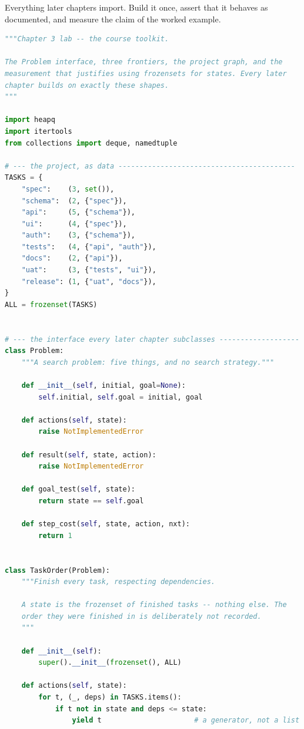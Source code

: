 \begin{lab}
Everything later chapters import. Build it once, assert that it behaves as
documented, and measure the claim of the worked example.
\begin{lstlisting}[language=Python]
"""Chapter 3 lab -- the course toolkit.

The Problem interface, three frontiers, the project graph, and the
measurement that justifies using frozensets for states. Every later
chapter builds on exactly these shapes.
"""

import heapq
import itertools
from collections import deque, namedtuple

# --- the project, as data ------------------------------------------
TASKS = {
    "spec":    (3, set()),
    "schema":  (2, {"spec"}),
    "api":     (5, {"schema"}),
    "ui":      (4, {"spec"}),
    "auth":    (3, {"schema"}),
    "tests":   (4, {"api", "auth"}),
    "docs":    (2, {"api"}),
    "uat":     (3, {"tests", "ui"}),
    "release": (1, {"uat", "docs"}),
}
ALL = frozenset(TASKS)


# --- the interface every later chapter subclasses -------------------
class Problem:
    """A search problem: five things, and no search strategy."""

    def __init__(self, initial, goal=None):
        self.initial, self.goal = initial, goal

    def actions(self, state):
        raise NotImplementedError

    def result(self, state, action):
        raise NotImplementedError

    def goal_test(self, state):
        return state == self.goal

    def step_cost(self, state, action, nxt):
        return 1


class TaskOrder(Problem):
    """Finish every task, respecting dependencies.

    A state is the frozenset of finished tasks -- nothing else. The
    order they were finished in is deliberately not recorded.
    """

    def __init__(self):
        super().__init__(frozenset(), ALL)

    def actions(self, state):
        for t, (_, deps) in TASKS.items():
            if t not in state and deps <= state:
                yield t                      # a generator, not a list


\end{lstlisting}
\end{lab}
